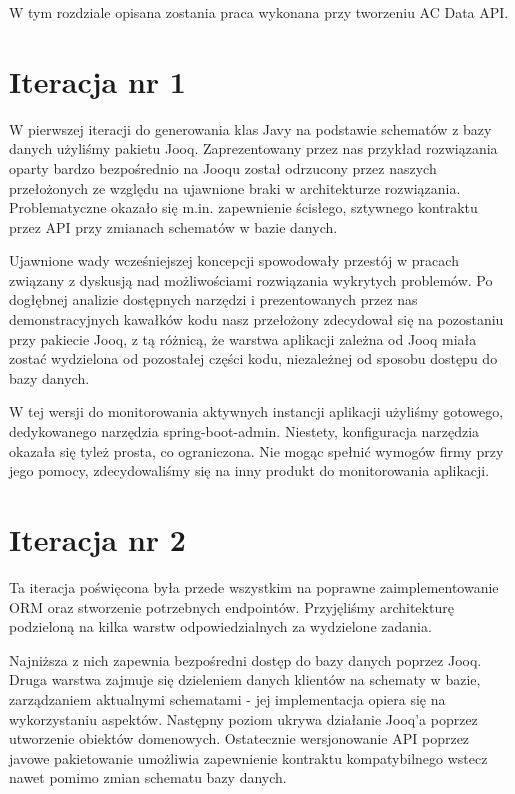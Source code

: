 \documentclass[licencjacka]{pracamgr}
\begin{document}
W tym rozdziale opisana zostania praca wykonana przy tworzeniu AC Data API.

\section{Iteracja nr 1}

W pierwszej iteracji do generowania klas Javy na podstawie schematów z bazy danych użyliśmy pakietu Jooq. Zaprezentowany przez nas przykład rozwiązania oparty bardzo bezpośrednio na Jooqu został odrzucony przez naszych przełożonych ze względu na ujawnione braki w architekturze rozwiązania. Problematyczne okazało się m.in. zapewnienie ścisłego, sztywnego kontraktu przez API przy zmianach schematów w bazie danych.

\vspace{1mm}

Ujawnione wady wcześniejszej koncepcji spowodowały przestój w pracach związany z dyskusją nad możliwościami rozwiązania wykrytych problemów. Po dogłębnej analizie dostępnych narzędzi i prezentowanych przez nas demonstracyjnych kawałków kodu nasz przełożony zdecydował się na pozostaniu przy pakiecie Jooq, z tą różnicą, że warstwa aplikacji zależna od Jooq miała zostać wydzielona od pozostałej części kodu, niezależnej od sposobu dostępu do bazy danych.

\vspace{1mm}

W tej wersji do monitorowania aktywnych instancji aplikacji użyliśmy gotowego, dedykowanego narzędzia spring-boot-admin. Niestety, konfiguracja narzędzia okazała się tyleż prosta, co ograniczona. Nie mogąc spełnić wymogów firmy przy jego pomocy, zdecydowaliśmy się na inny produkt do monitorowania aplikacji.
	
\section{Iteracja nr 2}

Ta iteracja poświęcona była przede wszystkim na poprawne zaimplementowanie ORM oraz stworzenie potrzebnych endpointów. Przyjęliśmy architekturę podzieloną na kilka warstw odpowiedzialnych za wydzielone zadania. 

\vspace{1mm}

Najniższa z nich zapewnia bezpośredni dostęp do bazy danych poprzez Jooq. Druga warstwa zajmuje się dzieleniem danych klientów na schematy w bazie, zarządzaniem aktualnymi schematami - jej implementacja opiera się na wykorzystaniu aspektów. Następny poziom ukrywa działanie Jooq’a poprzez utworzenie obiektów domenowych. Ostatecznie wersjonowanie API poprzez javowe pakietowanie umożliwia zapewnienie kontraktu kompatybilnego wstecz nawet pomimo zmian schematu bazy danych.
\end{document}
